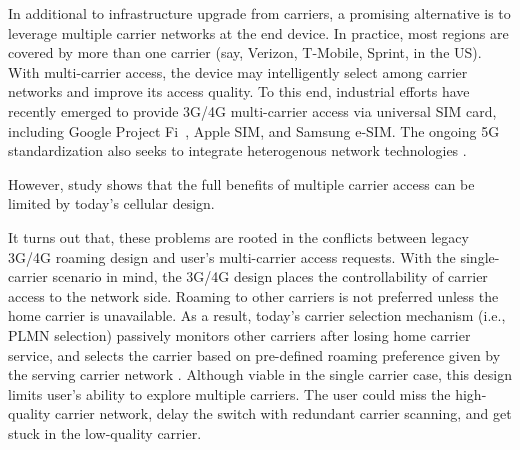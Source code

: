 \documentclass{./template/sig-alternate-10pt-tight}
\begin{document}
\begin{sloppypar}
In additional to infrastructure upgrade from carriers, a promising alternative is to leverage multiple carrier networks at the end device.
In practice, most regions are covered by more than one carrier (say, Verizon, T-Mobile, Sprint, \etc in the US). 
With multi-carrier access, the device may intelligently select among carrier networks and improve its access quality.
To this end, industrial efforts have recently emerged to provide 3G/4G multi-carrier access via universal SIM card, including Google Project Fi~\cite{fi}, Apple SIM\cite{apple-sim}, and Samsung e-SIM\cite{samsung-esim}.
The ongoing 5G standardization also seeks to integrate heterogenous network technologies \cite{ngmn-5g}.

However, study shows that the full benefits of multiple carrier access can be limited by today's cellular design. 

It turns out that, these problems are rooted in the conflicts between legacy 3G/4G roaming design and user's multi-carrier access requests.
With the single-carrier scenario in mind, the 3G/4G design places the controllability of carrier access to the network side. 
Roaming to other carriers is not preferred unless the home carrier is unavailable. 
As a result, today's carrier selection mechanism (i.e., PLMN selection) passively monitors other carriers after losing home carrier service, and selects the carrier based on pre-defined roaming preference given by the serving carrier network \cite{TS36.304,TS23.122}.
Although viable in the single carrier case, this design limits user's ability to explore multiple carriers. 
The user could miss the high-quality carrier network, delay the switch with redundant carrier scanning, and get stuck in the low-quality carrier.


\end{sloppypar}
\end{document}
